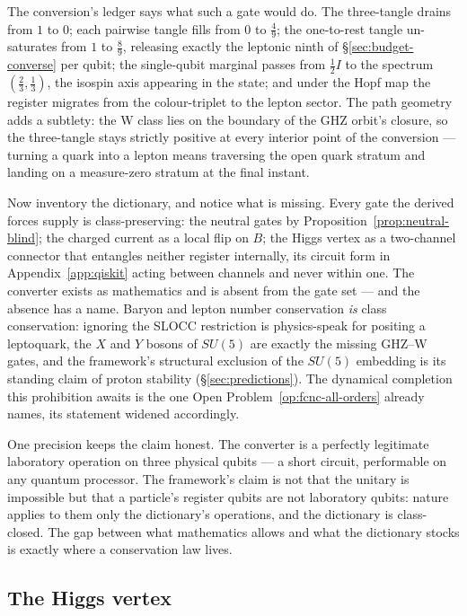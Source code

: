 The conversion's ledger says what such a gate would do. The three-tangle drains from $1$ to $0$;
each pairwise tangle fills from $0$ to $\tfrac49$; the one-to-rest tangle un-saturates from $1$ to
$\tfrac89$, releasing exactly the leptonic ninth of \S\ref{sec:budget-converse} per qubit; the
single-qubit marginal passes from $\tfrac12 I$ to the spectrum $(\tfrac23, \tfrac13)$, the
isospin axis appearing in the state; and under the Hopf map the register migrates from the
colour-triplet to the lepton sector. The path geometry adds a subtlety: the W class lies on the
boundary of the GHZ orbit's closure, so the three-tangle stays strictly positive at every interior
point of the conversion --- turning a quark into a lepton means traversing the open quark stratum
and landing on a measure-zero stratum at the final instant.

Now inventory the dictionary, and notice what is missing. Every gate the derived forces supply is
class-preserving: the neutral gates by Proposition~\ref{prop:neutral-blind}; the charged current
as a local flip on $B$; the Higgs vertex as a two-channel connector that entangles neither register
internally, its circuit form in Appendix~\ref{app:qiskit} acting between channels and never within
one. The converter exists as mathematics and is absent from the gate set --- and the absence has a
name. Baryon and lepton number conservation \emph{is} class conservation: ignoring the SLOCC
restriction is physics-speak for positing a leptoquark, the $X$ and $Y$ bosons of $SU(5)$ are
exactly the missing GHZ--W gates, and the framework's structural exclusion of the $SU(5)$ embedding
is its standing claim of proton stability (\S\ref{sec:predictions}). The dynamical completion
this prohibition awaits is the one Open Problem~\ref{op:fcnc-all-orders} already names, its
statement widened accordingly.

One precision keeps the claim honest. The converter is a perfectly legitimate laboratory operation
on three physical qubits --- a short circuit, performable on any quantum processor. The framework's
claim is not that the unitary is impossible but that a particle's register qubits are not
laboratory qubits: nature applies to them only the dictionary's operations, and the dictionary is
class-closed. The gap between what mathematics allows and what the dictionary stocks is exactly
where a conservation law lives.

\subsection{The Higgs vertex}

